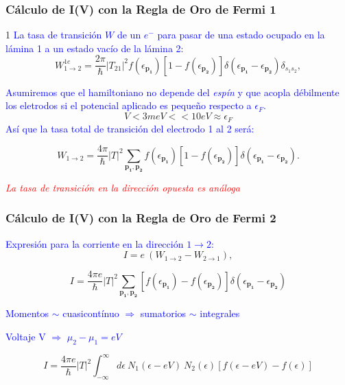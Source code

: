 \begin{frame}
\frametitle{C\'alculo de I(V) con la Regla de Oro de Fermi 1}

1 \textcolor{blue}{La tasa de transici\'on $W$ de un $e^-$ para pasar de una estado ocupado en la l\'amina 1 a un estado vac\'io de la l\'amina 2:}
\begin{equation}\label{probability1}
W_{1\to 2}^{1e} = \frac{2\pi}{\hbar} |T_{21}|^2 f(\epsilon_{\mathbf{p_1}}) [1-f(\epsilon_{\mathbf{p_2}})]
		\delta(\epsilon_{\mathbf{p_1}}-\epsilon_{\mathbf{p_2}})\delta_{s_1s_2},
\end{equation}

 \textcolor{blue}{Asumiremos que el hamiltoniano no depende del \emph{esp\'in} y que acopla d\'ebilmente los eletrodos si el potencial aplicado es peque\~no respecto a $\epsilon_F$.}
$$V < 3meV << 10eV \approx \epsilon_F$$
\textcolor{blue}{As\'i que la tasa total de transici\'on del electrodo 1 al 2 ser\'a:}

\begin{equation}\label{probability3}
W_{1\to 2} = \frac{4\pi}{\hbar} |T|^2 \sum_{\mathbf{p_1},\mathbf{p_2}}  
		f(\epsilon_{\mathbf{p_1}}) [1-f(\epsilon_{\mathbf{p_2}})] 
		\delta(\epsilon_{\mathbf{p_1}}-\epsilon_{\mathbf{p_2}}).
\end{equation}

\pause
\vspace{0.5cm}
\begin{center}
\emph{\textcolor{red}{La tasa de transici\'on en la direcci\'on opuesta es an\'aloga}}
\end{center}

\end{frame}
\begin{frame}
\frametitle{C\'alculo de I(V) con la Regla de Oro de Fermi 2}

\textcolor{blue}{Expresi\'on para la corriente en la direcci\'on $1\to 2$:}
\begin{equation}\label{current1}
I = e\ (W_{1\to 2} - W_{2\to 1}),
\end{equation}

\pause
\begin{equation}\label{current2}
I = \frac{4\pi e}{\hbar} |T|^2 \sum_{\mathbf{p_1},\mathbf{p_2}}  
		[f(\epsilon_{\mathbf{p_1}})-f(\epsilon_{\mathbf{p_2}})] 
		\delta(\epsilon_{\mathbf{p_1}}-\epsilon_{\mathbf{p_2}})
\end{equation}

\pause
\textcolor{blue}{Momentos $\sim$ cuasicont\'inuo $\Rightarrow$ sumatorios $\sim$ integrales}

\textcolor{blue}{Voltaje V $\Rightarrow$ $\mu_2-\mu_1=eV$}

\begin{equation}\label{current3}
I = \frac{4\pi e}{\hbar}  |T|^2 \int_{-\infty}^{\infty} d\epsilon\ N_1(\epsilon-eV)\ N_2(\epsilon) [f(\epsilon-eV)-f(\epsilon)]
\end{equation}


\end{frame}
